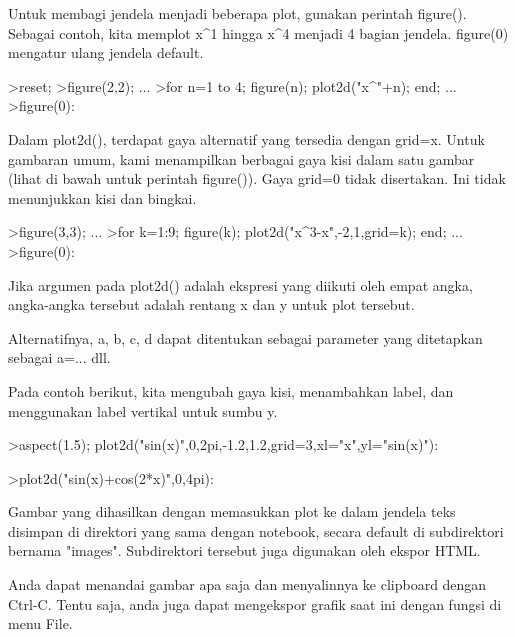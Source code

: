 \documentclass{article}
\begin{document}
\begin{eulernotebook}
\begin{eulercomment}
\begin{eulercomment}
\begin{eulercomment}
\begin{eulercomment}
\begin{eulercomment}
Untuk membagi jendela menjadi beberapa plot, gunakan perintah
figure(). Sebagai contoh, kita memplot x\textasciicircum{}1 hingga x\textasciicircum{}4 menjadi 4 bagian
jendela. figure(0) mengatur ulang jendela default.
\end{eulercomment}
\begin{eulerprompt}
>reset;
>figure(2,2); ...
>for n=1 to 4; figure(n); plot2d("x^"+n); end; ...
>figure(0):
\end{eulerprompt}
\begin{eulercomment}
Dalam plot2d(), terdapat gaya alternatif yang tersedia dengan grid=x.
Untuk gambaran umum, kami menampilkan berbagai gaya kisi dalam satu
gambar (lihat di bawah untuk perintah figure()). Gaya grid=0 tidak
disertakan. Ini tidak menunjukkan kisi dan bingkai.
\end{eulercomment}
\begin{eulerprompt}
>figure(3,3); ...
>for k=1:9; figure(k); plot2d("x^3-x",-2,1,grid=k); end; ...
>figure(0):
\end{eulerprompt}
\begin{eulercomment}
Jika argumen pada plot2d() adalah ekspresi yang diikuti oleh empat
angka, angka-angka tersebut adalah rentang x dan y untuk plot
tersebut.

Alternatifnya, a, b, c, d dapat ditentukan sebagai parameter yang
ditetapkan sebagai a=... dll.

Pada contoh berikut, kita mengubah gaya kisi, menambahkan label, dan
menggunakan label vertikal untuk sumbu y.
\end{eulercomment}
\begin{eulerprompt}
>aspect(1.5); plot2d("sin(x)",0,2pi,-1.2,1.2,grid=3,xl="x",yl="sin(x)"):
\end{eulerprompt}
\begin{eulerprompt}
>plot2d("sin(x)+cos(2*x)",0,4pi):
\end{eulerprompt}
\begin{eulercomment}
Gambar yang dihasilkan dengan memasukkan plot ke dalam jendela teks
disimpan di direktori yang sama dengan notebook, secara default di
subdirektori bernama "images". Subdirektori tersebut juga digunakan
oleh ekspor HTML.

Anda dapat menandai gambar apa saja dan menyalinnya ke clipboard
dengan Ctrl-C. Tentu saja, anda juga dapat mengekspor grafik saat ini
dengan fungsi di menu File.


\end{eulercomment}
\end{eulercomment}
\end{eulercomment}
\end{eulercomment}
\end{eulercomment}
\end{eulernotebook}
\end{document}

